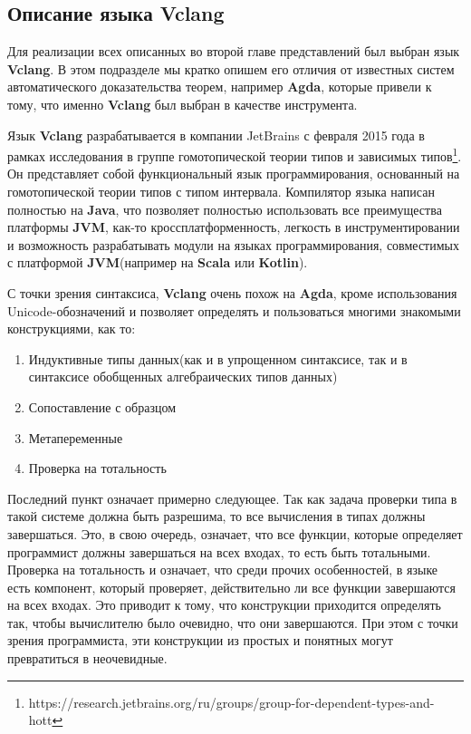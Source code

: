 \subsection{Описание языка Vclang}

Для реализации всех описанных во второй главе представлений был выбран язык \textbf{Vclang}. В этом подразделе мы кратко опишем его отличия от известных систем автоматического доказательства теорем, например \textbf{Agda}, которые привели к тому, что именно \textbf{Vclang} был выбран в качестве инструмента.

Язык \textbf{Vclang} разрабатывается в компании JetBrains с февраля 2015 года в рамках исследования в группе гомотопической теории типов и зависимых типов\footnote{https://research.jetbrains.org/ru/groups/group-for-dependent-types-and-hott}. Он представляет собой функциональный язык программирования, основанный на гомотопической теории типов с типом интервала. Компилятор языка написан полностью на \textbf{Java}, что позволяет полностью использовать все преимущества платформы \textbf{JVM}, как-то кроссплатформенность, легкость в инструментировании и возможность разрабатывать модули на языках программирования, совместимых с платформой \textbf{JVM}(например на \textbf{Scala} или \textbf{Kotlin}).

С точки зрения синтаксиса, \textbf{Vclang} очень похож на \textbf{Agda}, кроме использования Unicode-обозначений и позволяет определять и пользоваться многими знакомыми конструкциями, как то:
\begin{enumerate}
  \item Индуктивные типы данных(как и в упрощенном синтаксисе, так и в синтаксисе обобщенных алгебраических типов данных)
  \item Сопоставление с образцом
  \item Метапеременные
  \item Проверка на тотальность
\end{enumerate}

Последний пункт означает примерно следующее. Так как задача проверки типа в такой системе должна быть разрешима, то все вычисления в типах должны завершаться. Это, в свою очередь, означает, что все функции, которые определяет программист должны завершаться на всех входах, то есть быть тотальными. Проверка на тотальность и означает, что среди прочих особенностей, в языке есть компонент, который проверяет, действительно ли все функции завершаются на всех входах. Это приводит к тому, что конструкции приходится определять так, чтобы вычислителю было очевидно, что они завершаются. При этом с точки зрения программиста, эти конструкции из простых и понятных могут превратиться в неочевидные.

